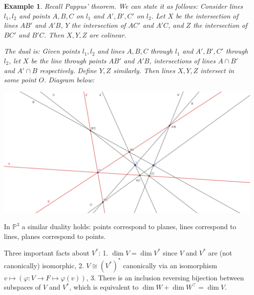 \documentclass[12pt]{article}
\renewcommand{\P}{\mathbb{P}}
\renewcommand{\phi}{\varphi}
\newtheorem*{example}{Example}
\begin{document}
    \begin{example}
        Recall Pappus' theorem. We can state it as follows: Consider lines $l_1, l_2$ and points $A, B, C$ on $l_1$ and $A', B', C'$ on $l_2$. Let $X$ be the intersection of lines $AB'$ and $A'B$, $Y$ the intersection of $AC'$ and $A'C$, and $Z$ the intersection of $BC'$ and $B'C$. Then $X, Y, Z$ are colinear. \par 
        The dual is: Given points $l_1, l_2$ and lines $A, B, C$ through $l_1$ and $A', B', C'$ through $l_2$, let $X$ be the line through points $AB'$ and $A'B$, intersections of lines $A \cap B'$ and $A' \cap B$ respectively. Define $Y, Z$ similarly. Then lines $X, Y, Z$ intersect in some point $O$. Diagram below: 
        \begin{center}
            \includegraphics[width = \linewidth]{pappus_dual.png}
        \end{center}
    \end{example} 
    In $\P^3$ a similar duality holds: points correspond to planes, lines correspond to lines, planes correspond to points. \par 
    Three important facts about $V^*$: 1. $\dim V = \dim V^*$ since $V$ and $V^*$ are (not canonically) isomorphic, 2. $V \cong (V^*)^*$ canonically via an isomorphism $v \mapsto (\phi: V \to F \mapsto \phi(v))$, 3. There is an inclusion reversing bijection between subspaces of $V$ and $V^*$, which is equivalent to $\dim W + \dim W^\top = \dim V$. 
\end{document}
